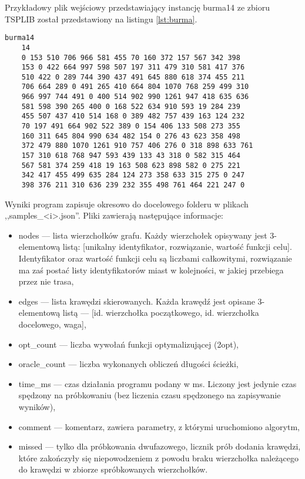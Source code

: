 Przykładowy plik wejściowy przedstawiający instancję burma14 ze zbioru TSPLIB został przedstawiony na listingu
\ref{lst:burma}.

\begin{lstlisting}[caption={Instancja burma14 w formacie akceptowanym przez program}, label=lst:burma]
    burma14
    14
    0 153 510 706 966 581 455 70 160 372 157 567 342 398 
    153 0 422 664 997 598 507 197 311 479 310 581 417 376 
    510 422 0 289 744 390 437 491 645 880 618 374 455 211 
    706 664 289 0 491 265 410 664 804 1070 768 259 499 310 
    966 997 744 491 0 400 514 902 990 1261 947 418 635 636 
    581 598 390 265 400 0 168 522 634 910 593 19 284 239 
    455 507 437 410 514 168 0 389 482 757 439 163 124 232 
    70 197 491 664 902 522 389 0 154 406 133 508 273 355 
    160 311 645 804 990 634 482 154 0 276 43 623 358 498 
    372 479 880 1070 1261 910 757 406 276 0 318 898 633 761 
    157 310 618 768 947 593 439 133 43 318 0 582 315 464 
    567 581 374 259 418 19 163 508 623 898 582 0 275 221 
    342 417 455 499 635 284 124 273 358 633 315 275 0 247 
    398 376 211 310 636 239 232 355 498 761 464 221 247 0     
\end{lstlisting}

Wyniki program zapisuje okresowo do docelowego folderu w plikach ,,samples\_<i>.json''.
Pliki zawierają następujące informacje:

\begin{itemize}
    \item nodes --- lista wierzchołków grafu. Każdy wierzchołek opisywany jest 3-elementową listą:
          [unikalny identyfikator, rozwiązanie, wartość funkcji celu]. Identyfikator oraz wartość funkcji celu
          są liczbami całkowitymi, rozwiązanie ma zaś postać listy identyfikatorów miast w kolejności, w jakiej przebiega przez nie trasa,
    \item edges --- lista krawędzi skierowanych. Każda krawędź jest opisane 3-elementową listą --- [id. wierzchołka początkowego, id. wierzchołka docelowego, waga],
    \item opt\_count --- liczba wywołań funkcji optymalizującej (2opt),
    \item oracle\_count --- liczba wykonanych obliczeń długości ścieżki,
    \item time\_ms --- czas działania programu podany w ms. Liczony jest jedynie czas spędzony na próbkowaniu
          (bez liczenia czasu spędzonego na zapisywanie wyników),
    \item comment --- komentarz, zawiera parametry, z którymi uruchomiono algorytm,
    \item missed --- tylko dla próbkowania dwufazowego, licznik prób dodania krawędzi, które zakończyły się
          niepowodzeniem z powodu braku wierzchołka należącego do krawędzi w zbiorze spróbkowanych wierzchołków.
\end{itemize}

